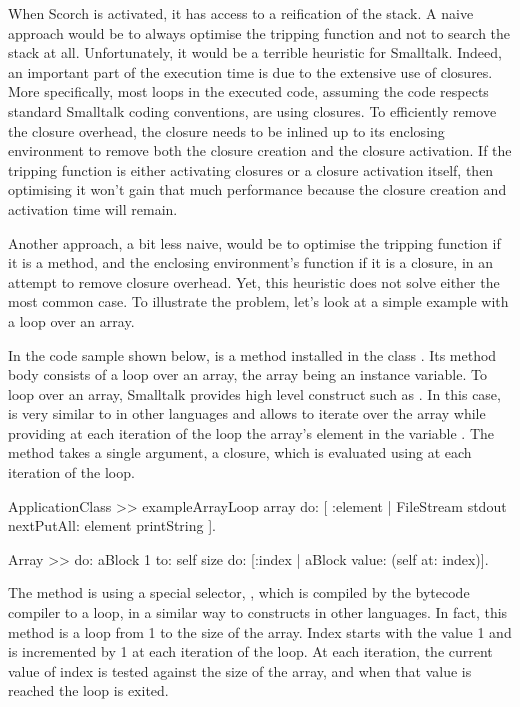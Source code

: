\documentclass[a4paper,12pt,twoside]{../includes/ThesisStyle}
\begin{document}
When Scorch is activated, it has access to a reification of the stack. A naive approach would be to always optimise the tripping function and not to search the stack at all. Unfortunately, it would be a terrible heuristic for Smalltalk. Indeed, an important part of the execution time is due to the extensive use of closures. More specifically, most loops in the executed code, assuming the code respects standard Smalltalk coding conventions, are using closures. To efficiently remove the closure overhead, the closure needs to be inlined up to its enclosing environment to remove both the closure creation and the closure activation. If the tripping function is either activating closures or a closure activation itself, then optimising it won't gain that much performance because the closure creation and activation time will remain.

Another approach, a bit less naive, would be to optimise the tripping function if it is a method, and the enclosing environment's function if it is a closure, in an attempt to remove closure overhead. Yet, this heuristic does not solve either the most common case. To illustrate the problem, let's look at a simple example with a loop over an array.

In the code sample shown below,  is a method installed in the class . Its method body consists of a loop over an array, the array being an instance variable. To loop over an array, Smalltalk provides high level construct such as . In this case,  is very similar to  in other languages and allows to iterate over the array while providing at each iteration of the loop the array's element in the variable . The  method takes a single argument, a closure, which is evaluated using  at each iteration of the loop.

\begin{code}
	ApplicationClass >> exampleArrayLoop
	    array do: [ :element | FileStream stdout nextPutAll: element printString ].
		
	Array >> do: aBlock
	    1 to: self size do: [:index | aBlock value: (self at: index)].
\end{code}

The method  is using a special selector, , which is compiled by the bytecode compiler to a loop, in a similar way to  constructs in other languages. In fact, this method is a loop from 1 to the size of the array. Index starts with the value 1 and is incremented by 1 at each iteration of the loop. At each iteration, the current value of index is tested against the size of the array, and when that value is reached the loop is exited.
\end{document}
